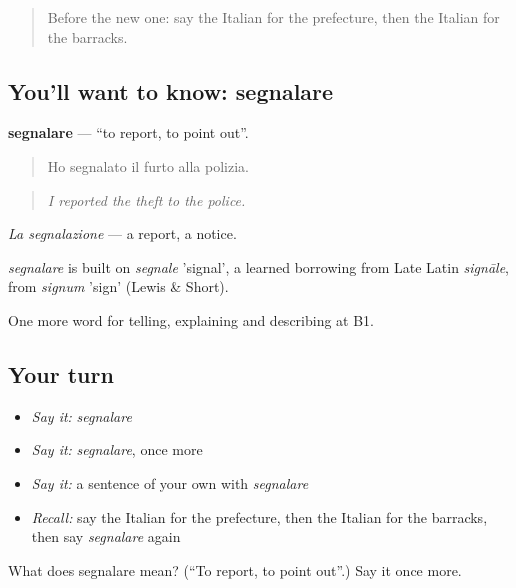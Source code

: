 \begin{quote}
Before the new one: say the Italian for the prefecture, then the Italian for the barracks.
\end{quote}

\subsection*{You'll want to know: segnalare}
\textbf{segnalare} — \textquotedblleft{}to report, to point out\textquotedblright{}.

\begin{quote}
Ho segnalato il furto alla polizia.
\end{quote}

\begin{quote}
\emph{I reported the theft to the police.}
\end{quote}

\emph{La segnalazione} — a report, a notice.

\begin{cousinweb}
\emph{segnalare} is built on \emph{segnale} 'signal', a learned borrowing from Late Latin \emph{signāle}, from \emph{signum} 'sign' (Lewis \& Short).
\end{cousinweb}

\begin{grammarlens}[title={What you've built}]
One more word for telling, explaining and describing at B1.
\end{grammarlens}

\subsection*{Your turn}
\begin{itemize}
\raggedright
  \item \emph{Say it:} \emph{segnalare}
  \item \emph{Say it:} \emph{segnalare}, once more
  \item \emph{Say it:} a sentence of your own with \emph{segnalare}
  \item \emph{Recall:} say the Italian for the prefecture, then the Italian for the barracks, then say \emph{segnalare} again
\end{itemize}

\begin{tcolorbox}[breakable,colback=teal!4,colframe=teal!35!black,title={Before you move on}]
What does segnalare mean? (\textquotedblleft{}To report, to point out\textquotedblright{}.) Say it once more.
\end{tcolorbox}
